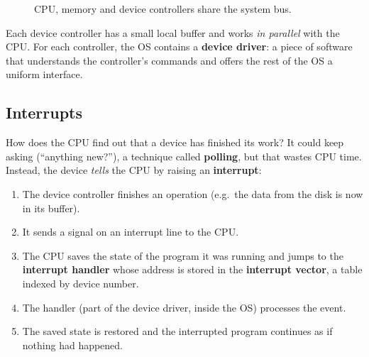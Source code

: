 \documentclass[11pt,a4paper]{article}
\newcommand{\term}[1]{\textbf{\color{mintdeep}#1}}
\begin{document}
\begin{figure}[H]
\centering
{}
\caption{CPU, memory and device controllers share the system bus.}
\end{figure}

Each device controller has a small local buffer and works \emph{in parallel} with the CPU. For each controller, the OS contains a \term{device driver}: a piece of software that understands the controller's commands and offers the rest of the OS a uniform interface.

\subsection{Interrupts}

How does the CPU find out that a device has finished its work? It could keep asking (``anything new?''), a technique called \term{polling}, but that wastes CPU time. Instead, the device \emph{tells} the CPU by raising an \term{interrupt}:

\begin{enumerate}[leftmargin=1.4em]
  \item The device controller finishes an operation (e.g.\ the data from the disk is now in its buffer).
  \item It sends a signal on an interrupt line to the CPU.
  \item The CPU saves the state of the program it was running and jumps to the \term{interrupt handler} whose address is stored in the \term{interrupt vector}, a table indexed by device number.
  \item The handler (part of the device driver, inside the OS) processes the event.
  \item The saved state is restored and the interrupted program continues as if nothing had happened.
\end{enumerate}
\end{document}
